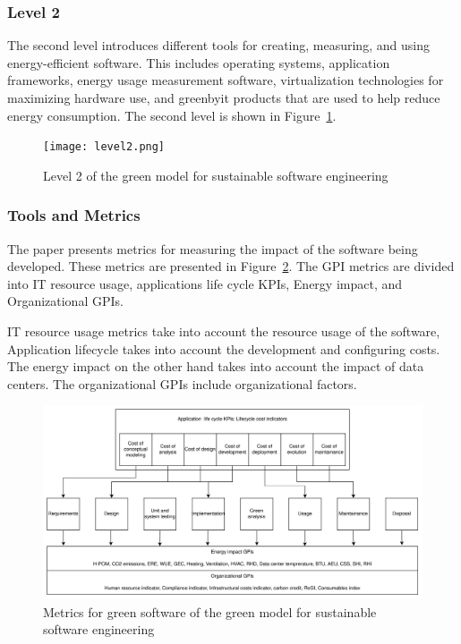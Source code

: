 \subsubsection{Level 2}
The second level introduces different tools for creating, measuring, and using energy-efficient software. This includes operating systems, application frameworks, energy usage measurement software, virtualization technologies for maximizing hardware use, and \gls{greenbyit} products that are used to help reduce energy consumption. The second level is shown in Figure~\ref{level2}.~\cite{greenmodelforsustainable}

\begin{figure}[H]
\caption{Level 2 of the green model for sustainable software engineering~\cite{greenmodelforsustainable}}
\label{level2}
\texttt{[image: level2.png]}
\centering
\end{figure}

\subsubsection{Tools and Metrics}
The paper presents metrics for measuring the impact of the software being developed. These metrics are presented in Figure~\ref{metrics}. The GPI metrics are divided into IT resource usage, applications life cycle KPIs, Energy impact, and Organizational GPIs.

IT resource usage metrics take into account the resource usage of the software, Application lifecycle takes into account the development and configuring costs. The energy impact on the other hand takes into account the impact of data centers. The organizational GPIs include organizational factors. ~\cite{greenmodelforsustainable}

\begin{figure}[H]
\caption{Metrics for green software of the green model for sustainable software engineering~\cite{greenmodelforsustainable}}
\label{metrics}
\includegraphics[width=\textwidth]{images/greenmetrics.png}
\centering
\end{figure}

